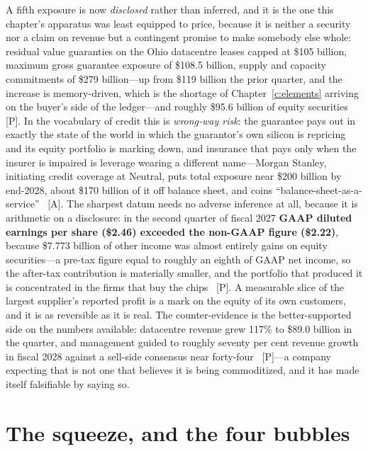 A fifth exposure is now \emph{disclosed} rather than inferred, and it is the one this chapter's apparatus was least equipped to price, because it is neither a security nor a claim on revenue but a contingent promise to make somebody else whole: residual value guaranties on the Ohio datacentre leases capped at \$105 billion, maximum gross guarantee exposure of \$108.5 billion, supply and capacity commitments of \$279 billion---up from \$119 billion the prior quarter, and the increase is memory-driven, which is the shortage of Chapter~\ref{c:elements} arriving on the buyer's side of the ledger---and roughly \$95.6 billion of equity securities~\cite{nvda-ohio,nvda-exposure} [P]. In the vocabulary of credit this is \emph{wrong-way risk}: the guarantee pays out in exactly the state of the world in which the guarantor's own silicon is repricing and its equity portfolio is marking down, and insurance that pays only when the insurer is impaired is leverage wearing a different name---Morgan Stanley, initiating credit coverage at Neutral, puts total exposure near \$200 billion by end-2028, about \$170 billion of it off balance sheet, and coins ``balance-sheet-as-a-service''~\cite{nvda-morgan-stanley} [A]. The sharpest datum needs no adverse inference at all, because it is arithmetic on a disclosure: in the second quarter of fiscal 2027 \textbf{GAAP diluted earnings per share (\$2.46) exceeded the non-GAAP figure (\$2.22)}, because \$7.773 billion of other income was almost entirely gains on equity securities---a pre-tax figure equal to roughly an eighth of GAAP net income, so the after-tax contribution is materially smaller, and the portfolio that produced it is concentrated in the firms that buy the chips~\cite{nvda-q2fy27,nvda-exposure} [P]. A measurable slice of the largest supplier's reported profit is a mark on the equity of its own customers, and it is as reversible as it is real. The counter-evidence is the better-supported side on the numbers available: datacentre revenue grew 117\% to \$89.0 billion in the quarter, and management guided to roughly seventy per cent revenue growth in fiscal 2028 against a sell-side consensus near forty-four~\cite{nvda-q2fy27,nvda-segments} [P]---a company expecting that is not one that believes it is being commoditized, and it has made itself falsifiable by saying so.

\section{The squeeze, and the four bubbles}

